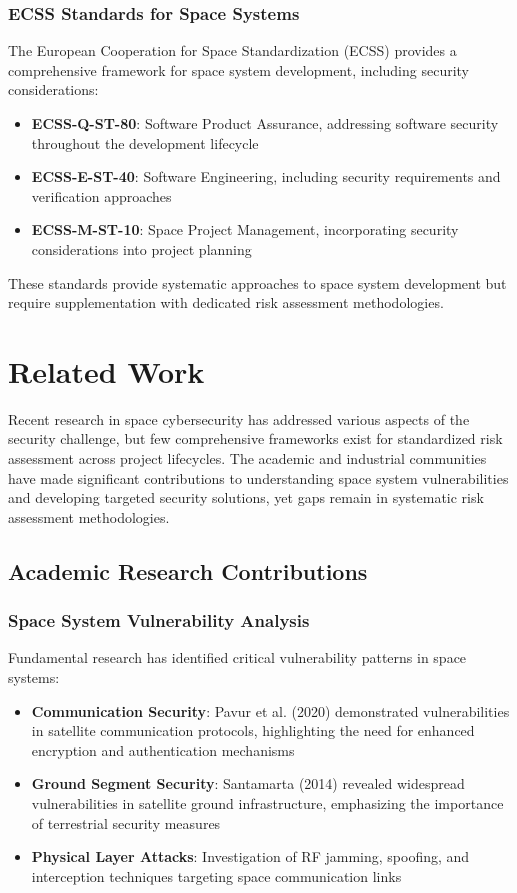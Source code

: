 \documentclass[binding=0.6cm]{sapthesis}
\begin{document}
\subsubsection{ECSS Standards for Space Systems}

The European Cooperation for Space Standardization (ECSS) provides a comprehensive framework for space system development, including security considerations:

\begin{itemize}
    \item \textbf{ECSS-Q-ST-80}: Software Product Assurance, addressing software security throughout the development lifecycle
    \item \textbf{ECSS-E-ST-40}: Software Engineering, including security requirements and verification approaches
    \item \textbf{ECSS-M-ST-10}: Space Project Management, incorporating security considerations into project planning
\end{itemize}

These standards provide systematic approaches to space system development but require supplementation with dedicated risk assessment methodologies.

\section{Related Work}

Recent research in space cybersecurity has addressed various aspects of the security challenge, but few comprehensive frameworks exist for standardized risk assessment across project lifecycles. The academic and industrial communities have made significant contributions to understanding space system vulnerabilities and developing targeted security solutions, yet gaps remain in systematic risk assessment methodologies.

\subsection{Academic Research Contributions}

\subsubsection{Space System Vulnerability Analysis}

Fundamental research has identified critical vulnerability patterns in space systems:

\begin{itemize}
    \item \textbf{Communication Security}: Pavur et al. (2020) demonstrated vulnerabilities in satellite communication protocols, highlighting the need for enhanced encryption and authentication mechanisms
    \item \textbf{Ground Segment Security}: Santamarta (2014) revealed widespread vulnerabilities in satellite ground infrastructure, emphasizing the importance of terrestrial security measures
    \item \textbf{Physical Layer Attacks}: Investigation of RF jamming, spoofing, and interception techniques targeting space communication links
\end{itemize}
\end{document}
